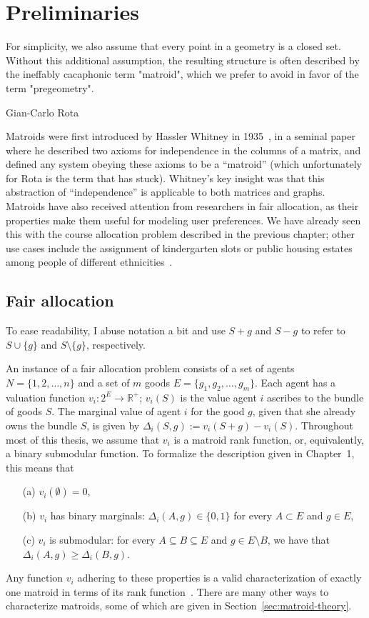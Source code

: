 \chapter{Preliminaries}
\label{chap:prelims}
\epigraph{For simplicity, we also assume that every point in a geometry is a closed set. Without this additional assumption, the resulting structure is often described by the ineffably cacaphonic term "matroid", which we prefer to avoid in favor of the term "pregeometry".}{Gian-Carlo Rota \cite{crapo_rota_1970}}

Matroids were first introduced by Hassler Whitney in 1935~\cite{whitney-1935}, in a seminal paper where he described two axioms for independence in the columns of a matrix, and defined any system obeying these axioms to be a ``matroid'' (which unfortunately for Rota is the term that has stuck). Whitney's key insight was that this abstraction of ``independence'' is applicable to both matrices and graphs. Matroids have also received attention from researchers in fair allocation, as their properties make them useful for modeling user preferences. We have already seen this with the course allocation problem described in the previous chapter; other use cases include the assignment of kindergarten slots or public housing estates among people of different ethnicities~\cite{benabbou-2021}.

\section{Fair allocation}
\label{sec:fa}
To ease readability, I abuse notation a bit and use $S+g$ and $S-g$ to refer to $S \cup \{g\}$ and $S \setminus \{g\}$, respectively.

An instance of a fair allocation problem consists of a set of agents $N = \{1,2,\ldots, n\}$ and a set of $m$ goods $E = \{g_1, g_2, \dots, g_m\}$. Each agent has a valuation function $v_i: 2^E \to \mathbb{R}^+$; $v_i(S)$ is the value agent $i$ ascribes to the bundle of goods $S$. The marginal value of agent $i$ for the good $g$, given that she already owns the bundle $S$, is given by $\Delta_i(S, g) := v_i(S + g) - v_i(S)$. Throughout most of this thesis, we assume that $v_i$ is a matroid rank function, or, equivalently, a binary submodular function. To formalize the description given in Chapter~1, this means that
\begin{enumerate}
  \item[(a)] $v_i(\emptyset) = 0$,
  \item[(b)] $v_i$ has binary marginals: $\Delta_i(A, g)\in \{0,1\}$ for every $A \subset E$ and $g\in E$,
  \item[(c)] $v_i$ is submodular: for every $A\subseteq B\subseteq E$ and $g\in E\setminus B$, we have that $\Delta_i(A, g) \geq \Delta_i(B, g)$.
\end{enumerate}
Any function $v_i$ adhering to these properties is a valid characterization of exactly one matroid in terms of its rank function~\cite{schrijver-2003}. There are many other ways to characterize matroids, some of which are given in Section~\ref{sec:matroid-theory}.

